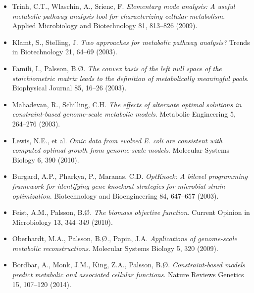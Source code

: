 \documentclass[a4paper, 11pt]{article}
\begin{document}
\begin{itemize}
{Evaluating the consequences of constraints}. Nature Reviews Microbiology 2, 886--897 (2004).
\item Trinh, C.T., Wlaschin, A., Srienc, F. \textit{Elementary mode analysis: A useful metabolic
pathway analysis tool for characterizing cellular metabolism}. Applied Microbiology and Biotechnology
81, 813--826 (2009).
\item Klamt, S., Stelling, J. \textit{Two approaches for metabolic pathway analysis?} Trends in
Biotechnology 21, 64--69 (2003).
\item Famili, I., Palsson, B.{\O}. \textit{The convex basis of the left null space of the
stoichiometric matrix leads to the definition of metabolically meaningful pools}. Biophysical
Journal 85, 16--26 (2003).
\item Mahadevan, R., Schilling, C.H. \textit{The effects of alternate optimal solutions in
constraint-based genome-scale metabolic models}. Metabolic Engineering 5, 264--276 (2003).
\item Lewis, N.E., et al. \textit{Omic data from evolved E. coli are consistent with computed
optimal growth from genome-scale models}. Molecular Systems Biology 6, 390 (2010).
\item Burgard, A.P., Pharkya, P., Maranas, C.D. \textit{OptKnock: A bilevel programming framework
for identifying gene knockout strategies for microbial strain optimization}. Biotechnology and
Bioengineering 84, 647--657 (2003).
\item Feist, A.M., Palsson, B.{\O}. \textit{The biomass objective function}. Current Opinion in
Microbiology 13, 344--349 (2010).
\item Oberhardt, M.A., Palsson, B.{\O}., Papin, J.A. \textit{Applications of genome-scale
metabolic reconstructions}. Molecular Systems Biology 5, 320 (2009).
\item Bordbar, A., Monk, J.M., King, Z.A., Palsson, B.{\O}. \textit{Constraint-based models
predict metabolic and associated cellular functions}. Nature Reviews Genetics 15, 107--120 (2014).
\end{itemize}
\end{document}
